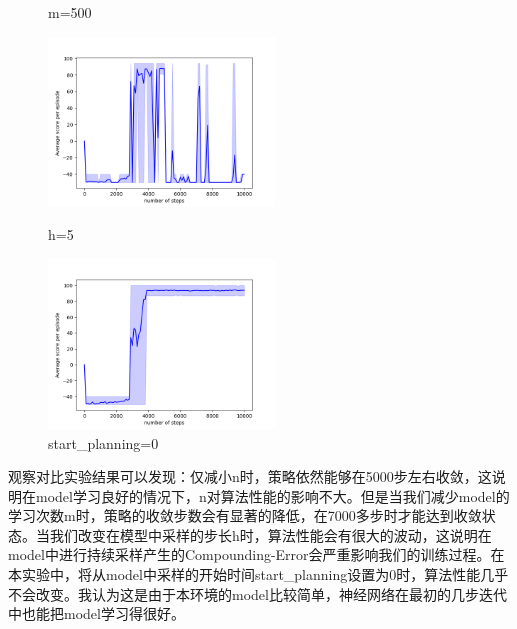 \documentclass[a4paper,12pt]{article}
\begin{document}
\begin{CJK}{UTF8}{gbsn}
\begin{figure}[htbp]
\begin{minipage}[t]{0.45\textwidth}
		\caption{m=500}
	\end{minipage}
	\begin{minipage}[t]{0.45\textwidth}
		\centering
		\includegraphics[width=6cm]{resource/n=300-m=1500-h=5-sp=5/performance.png}
		\caption{h=5}
	\end{minipage}
	\begin{minipage}[t]{0.45\textwidth}
		\centering
		\includegraphics[width=6cm]{resource/n=300-m=1500-h=1-sp=0/performance.png}
		\caption{start\_planning=0}
	\end{minipage}
	\vspace{-1.5cm}
\end{figure}
\newpage
观察对比实验结果可以发现：仅减小n时，策略依然能够在5000步左右收敛，这说明在model学习良好的情况下，n对算法性能的影响不大。但是当我们减少model的学习次数m时，策略的收敛步数会有显著的降低，在7000多步时才能达到收敛状态。当我们改变在模型中采样的步长h时，算法性能会有很大的波动，这说明在model中进行持续采样产生的Compounding-Error会严重影响我们的训练过程。在本实验中，将从model中采样的开始时间start\_planning设置为0时，算法性能几乎不会改变。我认为这是由于本环境的model比较简单，神经网络在最初的几步迭代中也能把model学习得很好。


\end{CJK}
\end{document}
